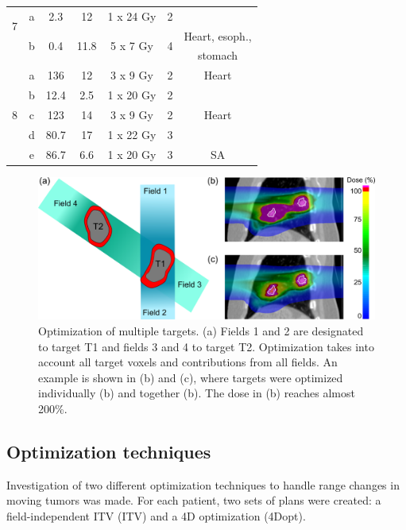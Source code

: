 \documentclass[type=dr, dr=rernat, accentcolor=tud7b,colorbacktitle, bigchapter, openright, twoside, 12pt ]{tudthesis}
\begin{document}
\begin{table}[H]
\begin{tabular}{c|c|c|c|c|c|c}
		 \hline
		 \multirow{2}{*}{7} & a & 2.3 & 12  & 1 x 24 Gy & 2 &\\
		 & \multirow{2}{*}{b} & \multirow{2}{*}{0.4} & \multirow{2}{*}{11.8}  & \multirow{2}{*}{5 x 7 Gy} & \multirow{2}{*}{4} & Heart, esoph., \\
		 & & & & & & stomach \\
		 \hline
		 \multirow{5}{*}{8} & a & 136 & 12  & 3 x 9 Gy & 2 & Heart\\
		  & b & 12.4 & 2.5  & 1 x 20 Gy & 2 &\\
		  & c & 123 & 14  & 3 x 9 Gy & 2  &Heart \\
		 & d & 80.7 & 17  & 1 x 22 Gy & 3  &\\
		 & e & 86.7 & 6.6  & 1 x 20 Gy & 3 & SA \\
		\hline\hline
	\end{tabular}
	\label{tab:patdata2}
\end{table}


\newpage


\begin{figure}[H]
	\begin{center}
		\includegraphics[width=1\textwidth]{./Images/multiTarget.png}
		\caption{Optimization of multiple targets. (a) Fields 1 and 2 are designated to target T1 and fields 3 and 4 to target T2. 
		Optimization takes into account all target voxels and contributions from all fields. An example is shown in (b) and (c), where targets
		were optimized individually (b) and together (b). The dose in (b) reaches almost 200\%.}
		\label{Fig:multiTargets}
	\end{center}
\end{figure}



\subsection{Optimization techniques}

Investigation of two different optimization techniques to handle range changes in moving tumors was made. For each patient, two sets of plans were created: a field-independent ITV (ITV) and a 4D optimization (4Dopt). 
\end{document}
